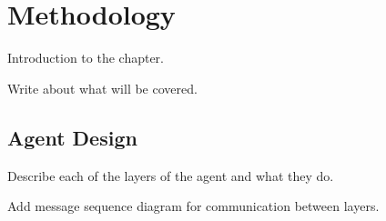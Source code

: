 \section{Methodology}

Introduction to the chapter.

Write about what will be covered.



\subsection{Agent Design}

Describe each of the layers of the agent and what they do.

Add message sequence diagram for communication between layers.








